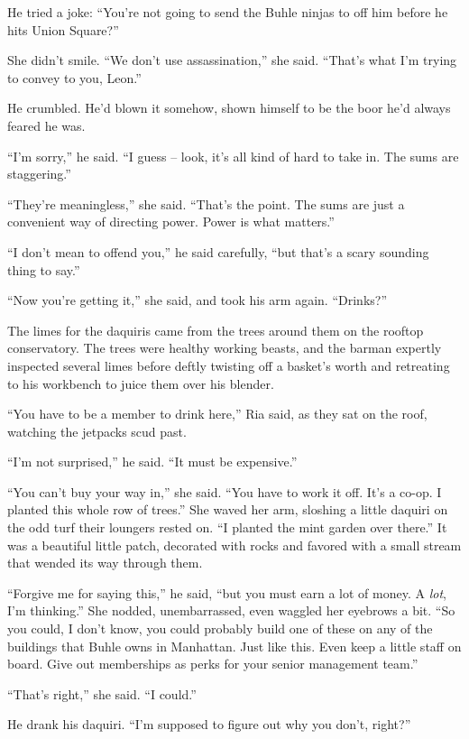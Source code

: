 He tried a joke: “You're not going to send the Buhle ninjas to off 
him before he hits Union Square?”

She didn't smile. “We don't use assassination,” she said. “That's 
what I'm trying to convey to you, Leon.”

He crumbled. He'd blown it somehow, shown himself to be the boor he'd 
always feared he was.

“I'm sorry,” he said. “I guess -- look, it's all kind of hard to 
take in. The sums are staggering.”

“They're meaningless,” she said. “That's the point. The sums are 
just a convenient way of directing power. Power is what matters.”

“I don't mean to offend you,” he said carefully, “but that's a 
scary sounding thing to say.”

“Now you're getting it,” she said, and took his arm again. 
“Drinks?”

\tb

The limes for the daquiris came from the trees around them on the 
rooftop conservatory. The trees were healthy working beasts, and the 
barman expertly inspected several limes before deftly twisting off a 
basket's worth and retreating to his workbench to juice them over his 
blender.

“You have to be a member to drink here,” Ria said, as they sat on 
the roof, watching the jetpacks scud past.

“I'm not surprised,” he said. “It must be expensive.”

“You can't buy your way in,” she said. “You have to work it off. 
It's a co-op. I planted this whole row of trees.” She waved her arm, 
sloshing a little daquiri on the odd turf their loungers rested on. 
“I planted the mint garden over there.” It was a beautiful little 
patch, decorated with rocks and favored with a small stream that wended 
its way through them.

“Forgive me for saying this,” he said, “but you must earn a lot 
of money. A \emph{lot}, I'm thinking.” She nodded, unembarrassed, 
even waggled her eyebrows a bit. “So you could, I don't know, you 
could probably build one of these on any of the buildings that Buhle 
owns in Manhattan. Just like this. Even keep a little staff on board. 
Give out memberships as perks for your senior management team.”

“That's right,” she said. “I could.”

He drank his daquiri. “I'm supposed to figure out why you don't, 
right?”

